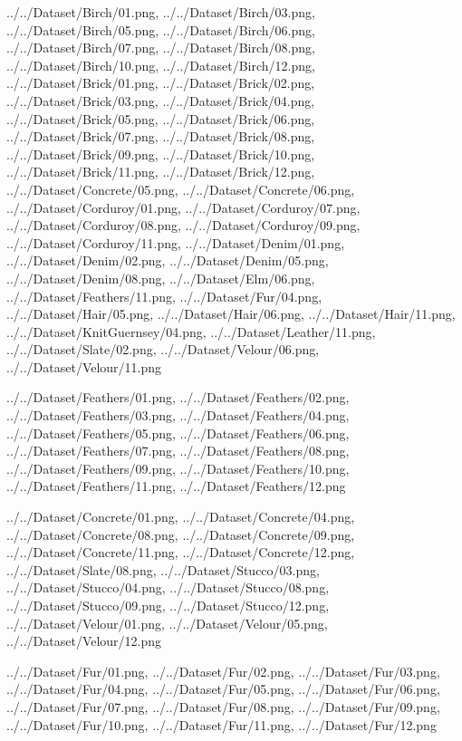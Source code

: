\documentclass[12pt,a4paper]{article}
\begin{document}
\begin{singlespace}
{../../Dataset/Birch/01.png,
../../Dataset/Birch/03.png,
../../Dataset/Birch/05.png,
../../Dataset/Birch/06.png,
../../Dataset/Birch/07.png,
../../Dataset/Birch/08.png,
../../Dataset/Birch/10.png,
../../Dataset/Birch/12.png,
../../Dataset/Brick/01.png,
../../Dataset/Brick/02.png,
../../Dataset/Brick/03.png,
../../Dataset/Brick/04.png,
../../Dataset/Brick/05.png,
../../Dataset/Brick/06.png,
../../Dataset/Brick/07.png,
../../Dataset/Brick/08.png,
../../Dataset/Brick/09.png,
../../Dataset/Brick/10.png,
../../Dataset/Brick/11.png,
../../Dataset/Brick/12.png,
../../Dataset/Concrete/05.png,
../../Dataset/Concrete/06.png,
../../Dataset/Corduroy/01.png,
../../Dataset/Corduroy/07.png,
../../Dataset/Corduroy/08.png,
../../Dataset/Corduroy/09.png,
../../Dataset/Corduroy/11.png,
../../Dataset/Denim/01.png,
../../Dataset/Denim/02.png,
../../Dataset/Denim/05.png,
../../Dataset/Denim/08.png,
../../Dataset/Elm/06.png,
../../Dataset/Feathers/11.png,
../../Dataset/Fur/04.png,
../../Dataset/Hair/05.png,
../../Dataset/Hair/06.png,
../../Dataset/Hair/11.png,
../../Dataset/KnitGuernsey/04.png,
../../Dataset/Leather/11.png,
../../Dataset/Slate/02.png,
../../Dataset/Velour/06.png,
../../Dataset/Velour/11.png}

{../../Dataset/Feathers/01.png,
../../Dataset/Feathers/02.png,
../../Dataset/Feathers/03.png,
../../Dataset/Feathers/04.png,
../../Dataset/Feathers/05.png,
../../Dataset/Feathers/06.png,
../../Dataset/Feathers/07.png,
../../Dataset/Feathers/08.png,
../../Dataset/Feathers/09.png,
../../Dataset/Feathers/10.png,
../../Dataset/Feathers/11.png,
../../Dataset/Feathers/12.png}

{../../Dataset/Concrete/01.png,
../../Dataset/Concrete/04.png,
../../Dataset/Concrete/08.png,
../../Dataset/Concrete/09.png,
../../Dataset/Concrete/11.png,
../../Dataset/Concrete/12.png,
../../Dataset/Slate/08.png,
../../Dataset/Stucco/03.png,
../../Dataset/Stucco/04.png,
../../Dataset/Stucco/08.png,
../../Dataset/Stucco/09.png,
../../Dataset/Stucco/12.png,
../../Dataset/Velour/01.png,
../../Dataset/Velour/05.png,
../../Dataset/Velour/12.png}

{../../Dataset/Fur/01.png,
../../Dataset/Fur/02.png,
../../Dataset/Fur/03.png,
../../Dataset/Fur/04.png,
../../Dataset/Fur/05.png,
../../Dataset/Fur/06.png,
../../Dataset/Fur/07.png,
../../Dataset/Fur/08.png,
../../Dataset/Fur/09.png,
../../Dataset/Fur/10.png,
../../Dataset/Fur/11.png,
../../Dataset/Fur/12.png}


\end{singlespace}
\end{document}
